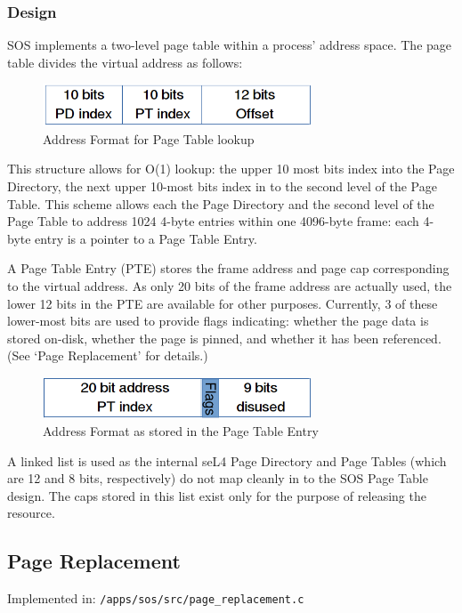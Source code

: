 \documentclass[a4paper,12pt]{article}
\begin{document}
\subsubsection{Design}
SOS implements a two-level page table within a process' address space.  The
page table divides the virtual address as follows:

\begin{figure}[h!]
  \centering
  \includegraphics[width=80mm]{add-format.png}
  \caption{Address Format for Page Table lookup}
\end{figure}

This structure allows for O(1) lookup: the upper 10 most bits index
into the Page Directory, the next upper 10-most bits index in to the second
level of the Page Table.  This scheme allows each the Page Directory and the
second level of the Page Table to address 1024 4-byte entries within one
4096-byte frame: each 4-byte entry is a pointer to a Page Table Entry.

A Page Table Entry (PTE) stores the frame address and page cap corresponding
to the virtual address.  As only 20 bits of the frame address are actually
used, the lower 12 bits in the PTE are available for other purposes.
Currently, 3 of these lower-most bits are used to provide flags indicating:
whether the page data is stored on-disk, whether the page is pinned, and
whether it has been referenced.  (See `Page Replacement' for details.)

\begin{figure}[h!]
  \centering
  \includegraphics[width=80mm]{pte-addr-format.png}
  \caption{Address Format as stored in the Page Table Entry}
\end{figure}

A linked list is used as the internal seL4 Page Directory and Page Tables
(which are 12 and 8 bits, respectively) do not map cleanly in to the SOS Page
Table design.  The caps stored in this list exist only for the purpose of
releasing the resource.

\subsection{Page Replacement}
Implemented in: \texttt{/apps/sos/src/page\_replacement.c}
\end{document}
